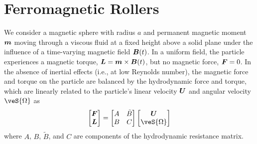 \section{Ferromagnetic Rollers}

We consider a magnetic sphere with radius $a$ and permanent magnetic moment $\boldsymbol{m}$ moving through a viscous fluid at a fixed height above a solid plane under the influence of a time-varying magnetic field $\boldsymbol{B}(t)$. In a uniform field, the particle experiences a magnetic torque, $\boldsymbol{L}=\boldsymbol{m}\times\boldsymbol{B}(t)$, but no magnetic force, $\boldsymbol{F}=0$. In the absence of inertial effects (i.e., at low Reynolds number), the magnetic force and torque on the particle are balanced by the hydrodynamic force and torque, which are linearly related to the particle's linear velocity $\boldsymbol{U}$ and angular velocity $\veS{\Omega}$ as
\begin{equation}
    \begin{bmatrix} \ve{F} \\ \ve{L} \end{bmatrix} = \begin{bmatrix} A & \tilde{B} \\ B & C \end{bmatrix}  \begin{bmatrix} \ve{U} \\ \veS{\Omega} \end{bmatrix} \label{eq:dynamics}
\end{equation}
where $A$, $B$, $\tilde{B}$, and $C$ are components of the hydrodynamic resistance matrix.  

